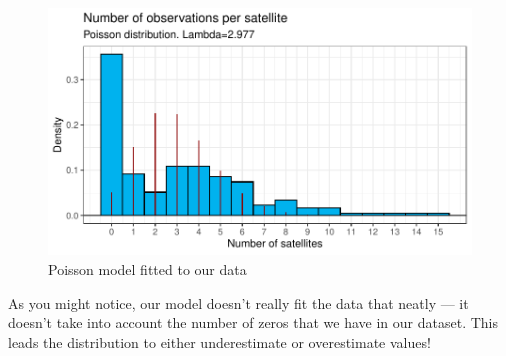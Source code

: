 \documentclass{article}\usepackage[]{graphicx}\usepackage[]{color}
\makeatletter
\def\maxwidth{ %
  \ifdim\Gin@nat@width>\linewidth
    \linewidth
  \else
    \Gin@nat@width
  \fi
}
\newenvironment{knitrout}{}{} %
\makeatother
\begin{document}
\begin{enumerate}
\begin{enumerate}
	\begin{figure}[H]
\begin{center}
\begin{knitrout}
\color{fgcolor}
\includegraphics[width=\maxwidth]{figure/unnamed-chunk-3-1} 
\end{knitrout}
	\caption{Poisson model fitted to our data}
\label{plot3} %
\end{center}
\end{figure}
As you might notice, our model doesn't really fit the data that neatly — it doesn't take into account the number of zeros that we have in our dataset. This leads the distribution to either underestimate or overestimate values!


\end{enumerate}
\end{enumerate}
\end{document}
